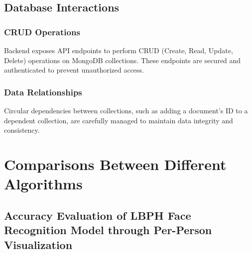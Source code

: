 \documentclass[conference]{IEEEtran}
\begin{document}
\subsection{Database Interactions}
\subsubsection{CRUD Operations}
Backend exposes API endpoints to perform CRUD (Create, Read, Update, Delete) operations on MongoDB collections. These endpoints are secured and authenticated to prevent unauthorized access.

\subsubsection{Data Relationships}
Circular dependencies between collections, such as adding a document's ID to a dependent collection, are carefully managed to maintain data integrity and consistency.
\section{Comparisons Between Different Algorithms}
\subsection{Accuracy Evaluation of LBPH Face Recognition Model through Per-Person Visualization}
\end{document}
